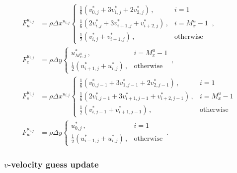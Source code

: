 \documentclass{article}
\begin{document}
\begin{subequations}
	\begin{align}
		F_n^{u_{i,j}} & = \rho \Delta x^{u_{i,j}} \begin{cases}
			\frac{1}{6} \left(v^*_{0, j} + 3 v^*_{1, j} + 2 v^*_{2, j} \right)\,, & i = 1 \\
			\frac{1}{6} \left(2 v^*_{i, j} + 3 v^*_{i + 1, j} + v^*_{i + 2, j} \right)\,, & i = M_x^u - 1 \\
			\frac{1}{2} \left(v^*_{i, j} + v^*_{i + 1, j}\right)\,, & \text{otherwise} 
		\end{cases}\,, \\
		F_e^{u_{i,j}} & = \rho \Delta y \begin{cases}
			u^*_{M_x^u, j}\,, & i = M_x^u - 1 \\
			\frac{1}{2} \left(u^*_{i+1, j} + u^*_{i,j}\right)\,, & \text{otherwise}
		\end{cases}\,, \\
		F_s^{u_{i,j}} & = \rho \Delta x^{u_{i,j}} \begin{cases}
			\frac{1}{6} \left(v^*_{0, j - 1} + 3 v^*_{1, j - 1} + 2 v^*_{2, j - 1} \right)\,, & i = 1 \\
			\frac{1}{6} \left(2 v^*_{i, j - 1} + 3 v^*_{i + 1, j - 1} + v^*_{i + 2, j - 1} \right)\,, & i = M_x^u - 1 \\
			\frac{1}{2} \left(v^*_{i, j - 1} + v^*_{i + 1, j - 1}\right)\,, & \text{otherwise} 
			\end{cases} \\
		F_w^{u_{i,j}} & = \rho \Delta y \begin{cases}
			u^*_{0, j}\,, & i = 1 \\
			\frac{1}{2} \left( u^*_{i - 1, j} + u^*_{i, j} \right)\,, & \text{otherwise}
		\end{cases}\,.
	\end{align}
\end{subequations}

\subsubsection{$v$-velocity guess update}
\end{document}
